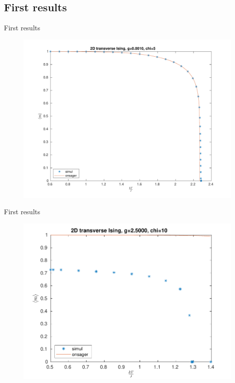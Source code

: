 \documentclass[aspectratio=169]{beamer}
\begin{document}
\subsection{First results}
\begin{frame}{First results}
    \begin{figure}
        \includegraphics[scale=0.4]{Figures/g00.pdf}
    \end{figure}
\end{frame}


\begin{frame}{First results}
    \begin{figure}
        \includegraphics[scale=0.5]{Figures/g25.pdf}
    \end{figure}
\end{frame}
\end{document}

